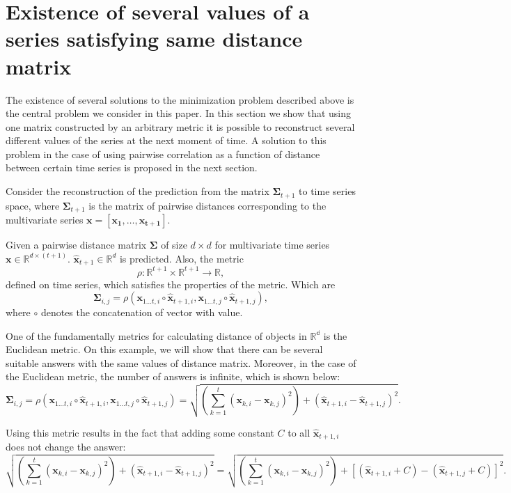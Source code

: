 \documentclass[12pt]{article}
\begin{document}
\section{Existence of several values of a series satisfying same distance matrix}

The existence of several solutions to the minimization problem described above is the central problem we consider in this paper. In this section we show that using one matrix constructed by an arbitrary metric it is possible to reconstruct several different values of the series at the next moment of time. A solution to this problem in the case of using pairwise correlation as a function of distance between certain time series is proposed in the next section.

Consider the reconstruction of the prediction from the matrix $\mathbf{\Sigma}_{t+1}$ to time series space, where $\mathbf{\Sigma}_{t+1}$ is the matrix of pairwise distances corresponding to the multivariate series $\mathbf{x}=[\mathbf{x_1}, \ldots, \mathbf{x_{t+1}}]$.

Given a pairwise distance matrix $\mathbf{\Sigma}$ of size $d \times d$ for multivariate time series $\mathbf{x} \in \mathbb{R}^{d \times (t+1)}$. $\hat{\mathbf{x}}_{t+1} \in \mathbb{R}^d$ is predicted. Also, the metric \[ \rho : \mathbb{R}^{t+1} \times \mathbb{R}^{t+1} \rightarrow \mathbb{R}, \] defined on time series, which satisfies the properties of the metric. Which are \[\mathbf{\Sigma}_{i,j} = \rho(\mathbf{x}_{1 \ldots t, i} \circ \hat{\mathbf{x}}_{t+1, i}, \mathbf{x}_{1 \ldots t, j} \circ \hat{\mathbf{x}}_{t+1, j}),\] where $\circ$ denotes the concatenation of vector with value.

One of the fundamentally metrics for calculating distance of objects in $\mathbb{R^d}$ is the Euclidean metric. On this example, we will show that there can be several suitable answers with the same values of distance matrix. Moreover, in the case of the Euclidean metric, the number of answers is infinite, which is shown below:
\[\mathbf{\Sigma}_{i,j} = \rho(\mathbf{x}_{1 \ldots t, i} \circ \hat{\mathbf{x}}_{t+1, i}, \mathbf{x}_{1 \ldots t, j} \circ \hat{\mathbf{x}}_{t+1, j})=\sqrt{\left(\sum_{k=1}^t (\mathbf{x}_{k,i}-\mathbf{x}_{k,j})^2\right) + (\hat{\mathbf{x}}_{t+1, i}-\hat{\mathbf{x}}_{t+1, j})^2}.\]

Using this metric results in the fact that adding some constant $C$ to all $\hat{\mathbf{x}}_{t+1, i}$ does not change the answer:
\[
\sqrt{\left(\sum_{k=1}^t (\mathbf{x}_{k,i}-\mathbf{x}_{k,j})^2\right) + (\hat{\mathbf{x}}_{t+1, i}-\hat{\mathbf{x}}_{t+1, j})^2} = \sqrt{\left(\sum_{k=1}^t (\mathbf{x}_{k,i}-\mathbf{x}_{k,j})^2\right) + [(\hat{\mathbf{x}}_{t+1, i} + C) -(\hat{\mathbf{x}}_{t+1, j} + C)]^2}.
\]
\end{document}
